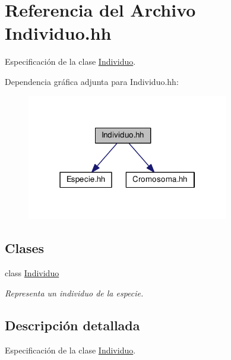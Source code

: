 \hypertarget{_individuo_8hh}{}\section{Referencia del Archivo Individuo.\+hh}
\label{_individuo_8hh}


Especificación de la clase \hyperlink{class_individuo}{Individuo}.  


Dependencia gráfica adjunta para Individuo.\+hh\+:\nopagebreak
\begin{figure}[H]
\begin{center}
\leavevmode
\includegraphics[width=250pt]{_individuo_8hh__incl}
\end{center}
\end{figure}
\subsection*{Clases}
\begin{DoxyCompactItemize}
\item 
class \hyperlink{class_individuo}{Individuo}
\begin{DoxyCompactList}\small\item\em Representa un individuo de la especie. \end{DoxyCompactList}\end{DoxyCompactItemize}


\subsection{Descripción detallada}
Especificación de la clase \hyperlink{class_individuo}{Individuo}. 


